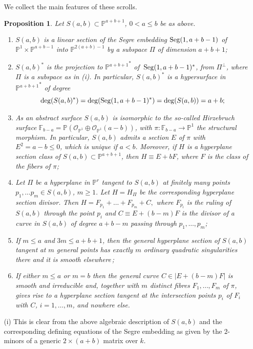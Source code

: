 \documentclass[11pt]{article}   %
\newtheorem{Proposition}[Theorem]{Proposition}
\theoremstyle{definition}
\numberwithin{Theorem}{section} \numberwithin{equation}{section}
\def\demo{\noindent{\it Proof. }}
\renewcommand{\O}{{\mathcal O}}
\newcommand{\Proj}{{\mathbb P}}
\newcommand{\p}{{\mathbb P}}
\begin{document}
{{We collect the main features of these scrolls.




\begin{Proposition}\label{scroll_features} Let $S(a,b)\subset\p^{a+b+1}$, $0<a\leq b$
be as above.
\begin{enumerate}
\item[{\rm (i)}] $S(a,b)$ is a  linear section of  the Segre embedding
${\rm Seg}(1,a+b-1)$ of $\p^{1}\times\p^{a+b-1}$ into
$\p^{2(a+b)-1}$ by a subspace $\Pi$ of dimension $a+b+1${\rm ;}
\item[{\rm (ii)}] $S(a,b)^*$ is the projection to ${\p^{a+b+1}}^*$ of
$\,{\rm Seg}(1,a+b-1)^*$, from $\Pi^{\perp}$, where $\Pi$ is a
subspace as in {\rm (i)}. In particular, $S(a,b)^ *$ is a
hypersurface in ${\p^{a+b+1}}^*$ of degree
$$\deg (S(a,b)^*)=\deg ({\rm Seg}(1,a+b-1)^ *)=\deg (S(a,b))=a+b;$$
\item[{\rm (iii)}]
As an abstract surface $S(a,b)$ is isomorphic to the so-called
\emph{ Hirzebruch surface\/} $\mathbb{F}_{b-a}=\Proj(\O_{\Proj^
1}\oplus \O_{\Proj^ 1}(a-b))$, with $\pi:\mathbb{F}_{b-a}\to\p^1$
the structural morphism. In particular, $S(a,b)$ admits a section
$E$ of $\pi$ with $E^2=a-b\leq 0$, which is unique if $a<b$.
Moreover, if $H$ is a hyperplane
section class of $S(a,b)\subset\p^{a+b+1}$, then $H\equiv E+bF$,
where $F$ is the class of the fibers of $\pi${\rm ;}
\item[{\rm (iv)}] Let $\Pi$ be a hyperplane in $\p^r$
tangent to $S(a,b)$ at finitely many points $p_1,\ldots p_m\in
S(a,b)$, $m\geq 1$. Let $H=H_\Pi$ be the corresponding hyperplane
section divisor. Then $H=F_{p_1}+\ldots+ F_{p_m}+ C,$ where
$F_{p_i}$ is the  ruling of $S(a,b)$ through the point $p_i$ and
$C\equiv E+(b-m)F$ is the divisor of a curve in $S(a,b)$ of degree
$a+b-m$ passing through $p_1,\dots, p_m${\rm ;}
\item[{\rm (v)}] If $m\leq a$ and $3m\leq a+b+1$, then the general hyperplane section
of $S(a,b)$ tangent at $m$ general points has exactly $m$ ordinary
quadratic singularities there and it is smooth elsewhere{$\,$\rm ;}
\item[{\rm (vi)}] If either $m\leq a$ or $m=b$ then the general curve $C\in | E+(b-m)F|$
is smooth and irreducible and, together with $m$ distinct fibres
$F_1,\dots ,F_m$ of $\pi$, gives rise to a hyperplane section
tangent at the  intersection points $p_i$ of $F_i$ with $C$,
$i=1,\dots,m$, and nowhere else.
\end{enumerate}
\end{Proposition}
\demo (i) This is clear from the above algebraic description of
$S(a,b)$  and the corresponding
defining equations of the Segre embedding as given by the $2$-minors
of a generic $2\times (a+b)$ matrix over $k$.

}}
\end{document}
